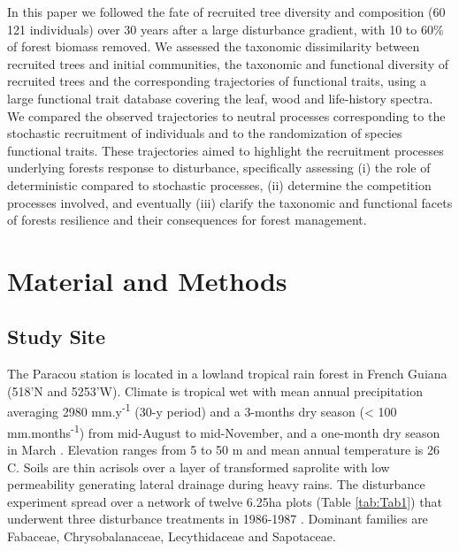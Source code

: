 \documentclass[fleqn,10pt]{ArtEcoFoG} %
\begin{document}
In this paper we followed the fate of recruited tree diversity and
composition (60 121 individuals) over 30 years after a large disturbance
gradient, with 10 to 60\% of forest biomass removed. We assessed the
taxonomic dissimilarity between recruited trees and initial communities,
the taxonomic and functional diversity of recruited trees and the
corresponding trajectories of functional traits, using a large
functional trait database covering the leaf, wood and life-history
spectra. We compared the observed trajectories to neutral processes
corresponding to the stochastic recruitment of individuals and to the
randomization of species functional traits. These trajectories aimed to
highlight the recruitment processes underlying forests response to
disturbance, specifically assessing (i) the role of deterministic
compared to stochastic processes, (ii) determine the competition
processes involved, and eventually (iii) clarify the taxonomic and
functional facets of forests resilience and their consequences for
forest management.

\section{Material and Methods}\label{material-and-methods}

\subsection{Study Site}\label{study-site}

The Paracou station is located in a lowland tropical rain forest in
French Guiana (518'N and 5253'W). Climate is tropical wet with mean
annual precipitation averaging 2980 mm.y\textsuperscript{-1} (30-y
period) and a 3-months dry season (\textless{} 100
mm.months\textsuperscript{-1}) from mid-August to mid-November, and a
one-month dry season in March \citep{Wagner2011}. Elevation ranges from
5 to 50 m and mean annual temperature is 26 C. Soils are thin acrisols
over a layer of transformed saprolite with low permeability generating
lateral drainage during heavy rains. The disturbance experiment spread
over a network of twelve 6.25ha plots (Table \ref{tab:Tab1}) that
underwent three disturbance treatments in 1986-1987 \citep{Herault2018}.
Dominant families are Fabaceae, Chrysobalanaceae, Lecythidaceae and
Sapotaceae.
\end{document}
